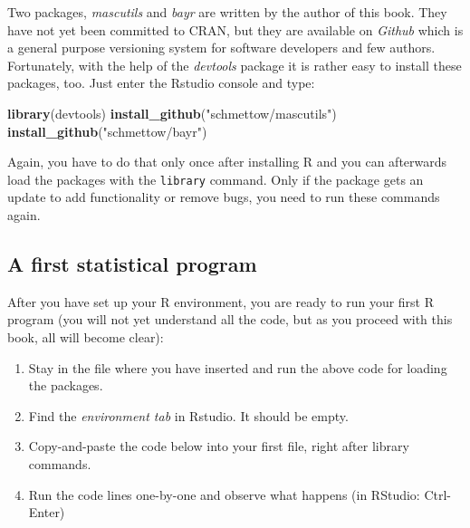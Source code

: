 \documentclass[]{svmono}
\newenvironment{Shaded}{\begin{snugshade}}{\end{snugshade}}
\newcommand{\KeywordTok}[1]{\textcolor[rgb]{0.13,0.29,0.53}{\textbf{#1}}}
\newcommand{\StringTok}[1]{\textcolor[rgb]{0.31,0.60,0.02}{#1}}
\newcommand{\NormalTok}[1]{#1}
\providecommand{\tightlist}{%
  \setlength{\itemsep}{0pt}\setlength{\parskip}{0pt}}
\begin{document}
Two packages, \emph{mascutils} and \emph{bayr} are written by the author
of this book. They have not yet been committed to CRAN, but they are
available on \emph{Github} which is a general purpose versioning system
for software developers and few authors. Fortunately, with the help of
the \emph{devtools} package it is rather easy to install these packages,
too. Just enter the Rstudio console and type:

\begin{Shaded}
\begin{Highlighting}[]
\KeywordTok{library}\NormalTok{(devtools)}
\KeywordTok{install_github}\NormalTok{(}\StringTok{"schmettow/mascutils"}\NormalTok{)}
\KeywordTok{install_github}\NormalTok{(}\StringTok{"schmettow/bayr"}\NormalTok{)}
\end{Highlighting}
\end{Shaded}

Again, you have to do that only once after installing R and you can
afterwards load the packages with the \texttt{library} command. Only if
the package gets an update to add functionality or remove bugs, you need
to run these commands again.

\subsection{A first statistical program}\label{first_program}

After you have set up your R environment, you are ready to run your
first R program (you will not yet understand all the code, but as you
proceed with this book, all will become clear):

\begin{enumerate}
\def\labelenumi{\arabic{enumi}.}
\tightlist
\item
  Stay in the file where you have inserted and run the above code for
  loading the packages.
\item
  Find the \emph{environment tab} in Rstudio. It should be empty.
\item
  Copy-and-paste the code below into your first file, right after
  library commands.
\item
  Run the code lines one-by-one and observe what happens (in RStudio:
  Ctrl-Enter)
\end{enumerate}
\end{document}
